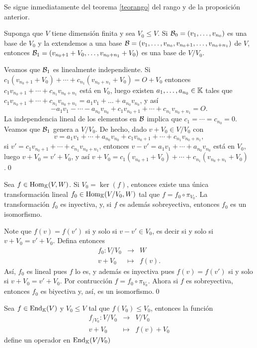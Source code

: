 \dem Se sigue inmediatamente del teorema \ref{teorango} del rango y de la proposición anterior.

\begin{prop}\label{basecociente}
  Suponga que $V$ tiene dimensión finita y sea $V_0\le V$. Si $\mathcal{B}_0=(v_1,\ldots,v_{n_0})$ es una base de $V_0$ y la extendemos a una base $\mathcal{B}=(v_1,\ldots,v_{n_0},v_{n_0+1},\ldots,v_{n_0+n_1})$ de $V$, entonces $\mathcal{B}_1=(v_{n_0+1}+V_0,\ldots,v_{n_0+n_1}+V_0)$ es una base de $V/V_0$.
\end{prop}

\dem Veamos que $\mathcal{B}_1$ es linealmente independiente. Si $c_1(v_{n_0+1}+V_0) + \cdots + c_{n_1}(v_{n_0+n_1}+V_0) = O+V_0$ entonces $c_1v_{n_0+1}+\cdots+c_{n_1}v_{n_0+n_1}$ está en $V_0$, luego existen $a_1,\ldots,a_{n_0}\in\mathbb{K}$ tales que $c_1v_{n_0+1}+\cdots+c_{n_1}v_{n_0+n_1}=a_1v_1+\ldots+a_{n_0}v_{n_0}$, y así $$-a_1v_1-\cdots-a_{n_0}v_{n_0}+c_1v_{n_0+1}+\cdots+c_{n_1}v_{n_0+n_1}=O.$$ La independencia lineal de los elementos en $\mathcal{B}$ implica que $c_1=\cdots=c_{n_0}=0$. Veamos que $\mathcal{B}_1$ genera a $V/V_0$. De hecho, dado $v+V_0\in V/V_0$ con $$v=a_1v_1+\cdots+a_{n_0}v_{n_0}+c_1v_{n_0+1}+\cdots+c_{n_1}v_{n_0+n_1},$$
si $v'=c_1v_{n_0+1}+\cdots+c_{n_1}v_{n_0+n_1}$, entonces $v-v'=a_1v_1+\cdots+a_{n_0}v_{n_0}$ está en $V_0$, luego $v+V_0=v'+V_0$, y así $v+V_0=c_1(v_{n_0+1}+V_0)+\cdots+c_{n_1}(v_{n_0+n_1}+V_0)$.\qed

\begin{teo}
Sea $f\in\operatorname{Hom}_\mathbb{K}(V,W)$. Si $V_0=\ker(f)$, entonces existe una \'unica transformaci\'on lineal $f_0\in\operatorname{Hom}_\mathbb{K}(V/V_0,W)$ tal que $f=f_0\circ\pi_{V_0}$. La transformaci\'on $f_{0}$ es inyectiva, y, si $f$ es adem\'as sobreyectiva, entonces $f_{0}$ es un isomorfismo.
\end{teo}

\dem Note que $f(v)=f(v')$ si y solo si $v-v'\in V_0$, es decir si y solo si $v+V_0=v'+V_0$. Defina entonces
\begin{eqnarray*}
f_{0}: V/V_0 & \longrightarrow & W\\
            v+V_0 & \longmapsto      & f(v).
\end{eqnarray*}
As\'i, $f_{0}$ es lineal pues $f$ lo es, y adem\'as es inyectiva pues $f(v)=f(v')$ si y solo si $v+V_0=v'+V_0$. Por contrucci\'on $f=f_{0}\circ\pi_{V_0}$. Ahora si $f$ es sobreyectiva, entonces $f_{0}$ es biyectiva y, as\'i, es un isomorfismo.\qed

\begin{teo}\label{operadorcociente}
  Sea $f\in\operatorname{End}_{\mathbb{K}}(V)$ y $V_0\le V$ tal que $f(V_0)\le V_0$, entonces la función
  \begin{eqnarray*}
    f_{/V_0}: V/V_0 & \longrightarrow & V/V_0\\
    v+V_0 & \longmapsto & f(v)+V_0
  \end{eqnarray*}
  define un operador en $\operatorname{End}_{\mathbb{K}}(V/V_0)$
\end{teo}

